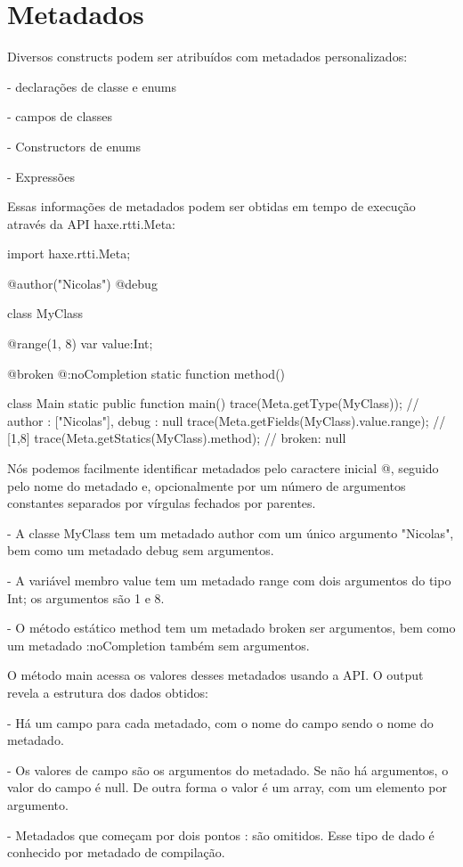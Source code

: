 {\section{Metadados}

Diversos constructs podem ser atribuídos com metadados personalizados:

 - declarações de classe e enums

 - campos de classes

 - Constructors de enums

 - Expressões

Essas informações de metadados podem ser obtidas em tempo de execução através da API haxe.rtti.Meta:

import haxe.rtti.Meta;

@author("Nicolas")
@debug

class MyClass {
    @range(1, 8)
    var value:Int;

    @broken
    @:noCompletion
    static function method() { }
}
class Main {
    static public function main() {
        trace(Meta.getType(MyClass)); 
                      // { author : ["Nicolas"], debug : null }
    trace(Meta.getFields(MyClass).value.range); // [1,8]
    trace(Meta.getStatics(MyClass).method); // { broken: null }
    }
}

Nós podemos facilmente identificar metadados pelo caractere inicial @, seguido pelo nome do metadado e, opcionalmente por um número de argumentos constantes separados por vírgulas fechados por parentes.

  - A classe MyClass tem um metadado author com um único argumento "Nicolas", bem como um metadado debug sem argumentos.

  - A variável membro value tem um metadado range com dois argumentos do tipo Int; os argumentos são 1 e 8.

  - O método estático method tem um metadado broken ser argumentos, bem como um metadado :noCompletion também sem argumentos.

  O método main acessa os valores desses metadados usando a API. O output revela a estrutura dos dados obtidos:

  - Há um campo para cada metadado, com o nome do campo sendo o nome do metadado.

  - Os valores de campo são os argumentos do metadado. Se não há argumentos, o valor do campo é null. De outra forma o valor é um array, com um elemento por argumento.

  - Metadados que começam por dois pontos : são omitidos. Esse tipo de dado é conhecido por metadado de compilação.

}
